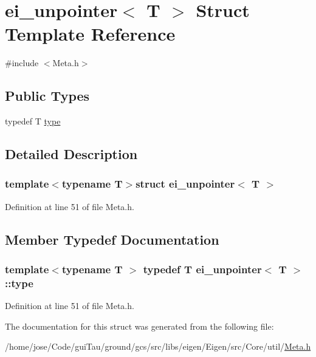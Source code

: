 \hypertarget{structei__unpointer}{\section{ei\-\_\-unpointer$<$ T $>$ Struct Template Reference}
\label{structei__unpointer}
}


{\ttfamily \#include $<$Meta.\-h$>$}

\subsection*{Public Types}
\begin{DoxyCompactItemize}
\item 
typedef T \hyperlink{structei__unpointer_a8e2f5d988e73dac2af15a1a8a12d3ba8}{type}
\end{DoxyCompactItemize}


\subsection{Detailed Description}
\subsubsection*{template$<$typename T$>$struct ei\-\_\-unpointer$<$ T $>$}



Definition at line 51 of file Meta.\-h.



\subsection{Member Typedef Documentation}
\hypertarget{structei__unpointer_a8e2f5d988e73dac2af15a1a8a12d3ba8}{
\subsubsection[{type}]{\setlength{\rightskip}{0pt plus 5cm}template$<$typename T $>$ typedef T {\bf ei\-\_\-unpointer}$<$ T $>$\-::{\bf type}}}\label{structei__unpointer_a8e2f5d988e73dac2af15a1a8a12d3ba8}


Definition at line 51 of file Meta.\-h.



The documentation for this struct was generated from the following file\-:\begin{DoxyCompactItemize}
\item 
/home/jose/\-Code/gui\-Tau/ground/gcs/src/libs/eigen/\-Eigen/src/\-Core/util/\hyperlink{_meta_8h}{Meta.\-h}\end{DoxyCompactItemize}
